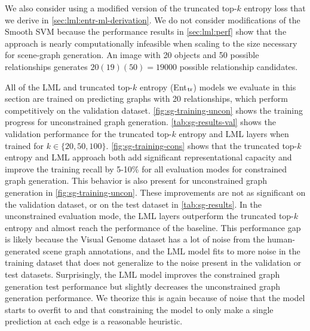 We also consider using a modified version of
the truncated top-$k$ entropy loss that
we derive in \cref{sec:lml:entr-ml-derivation}.
We do not consider modifications of the Smooth SVM
because the performance results in \cref{sec:lml:perf}
show that the approach is
nearly computationally infeasible when
scaling to the size necessary for scene-graph generation.
An image with 20 objects and 50 possible relationships
generates $20(19)(50)=19000$ possible relationship candidates.

All of the LML and truncated top-$k$ entropy (Ent$_{\rm tr}$) models
we evaluate in this section are trained on predicting
graphs with 20
relationships, which perform competitively on the
validation dataset.
\cref{fig:sg-training-uncon} shows the training progress for
unconstrained graph generation.
\cref{tab:sg-results-val} shows the validation performance
for the truncated top-$k$ entropy and LML layers when trained
for $k\in\{20,50,100\}$.
\cref{fig:sg-training-cons} shows that the truncated
top-$k$ entropy and LML approach both add significant representational
capacity and improve the training recall by 5-10\%
for all evaluation modes for constrained graph generation.
This behavior is also present for unconstrained graph
generation in \cref{fig:sg-training-uncon}.
These improvements are not as significant on
the validation dataset, or on the test dataset
in \cref{tab:sg-results}.
In the unconstrained evaluation mode, the LML layers
outperform the truncated top-$k$ entropy and almost
reach the performance of the baseline.
This performance gap is likely because the Visual Genome
dataset has a lot of noise from the human-generated scene graph
annotations, and the LML model fits to more noise
in the training dataset that does not generalize
to the noise present in the validation or test datasets.
Surprisingly, the LML model improves the constrained
graph generation test performance but slightly decreases
the unconstrained graph generation performance.
We theorize this is again because of noise that the
model starts to overfit to and that constraining
the model to only make a single prediction at each
edge is a reasonable heuristic.


